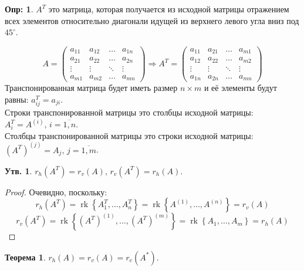 \documentclass[12pt]{article}
\theoremstyle{definition}
\newtheorem{defn}{Опр:}
\newtheorem{prop}{Утв.}
\newtheorem{theorem}{Теорема}
\DeclareMathOperator{\rk}{\text{rk}}
\begin{document}
\begin{defn}
	 $A^T$ это матрица, которая получается из исходной матрицы отражением всех элементов относительно диагонали идущей из верхнего левого угла вниз под $45^\circ$.
\end{defn}
$$
	A = 
	\begin{pmatrix}
		a_{11} & a_{12} & \dotsc & a_{1n}\\
		a_{21} & a_{22} & \dotsc & a_{2n}\\
		\vdots & \vdots & \ddots & \vdots \\
		a_{m1} & a_{m2} & \dotsc & a_{mn}
	\end{pmatrix} \Rightarrow A^T =
	\begin{pmatrix}
		a_{11} & a_{21} & \dotsc & a_{m1}\\
		a_{12} & a_{22} & \dotsc & a_{m2}\\
		\vdots & \vdots & \ddots & \vdots \\
		a_{1n} & a_{2n} & \dotsc & a_{mn}
	\end{pmatrix}
$$
Транспонированная матрица будет иметь размер $n \times m$ и её элементы будут равны: $a_{ij}^T = a_{ji}$.\\
Строки транспонированной матрицы это столбцы исходной матрицы: $A_i^T = A^{(i)}, \, i =\overline{1,n}$.\\
Столбцы транспонированной матрицы это строки исходной матрицы: $\left(A^T\right)^{(j)} = A_j, \, j =\overline{1,m}$.
\begin{prop}
	$r_{h}(A^T) = r_v(A), \, r_v\left(A^T\right) = r_h(A)$.
\end{prop}
\begin{proof}
	Очевидно, поскольку:
	$$
		r_h\left(A^T\right) = \rk{\left\{A_1^T, \dotsc, A_n^T\right\}} = \rk{\left\{A^{(1)}, \dotsc, A^{(n)}\right\}} = r_v(A)
	$$
	$$
		r_v\left(A^T\right) = \rk{\left\{\left(A^T\right)^{(1)}, \dotsc, \left(A^T\right)^{(m)}\right\}} = \rk{\left\{A_1, \dotsc, A_m\right\}}  = r_h(A)
	$$
\end{proof}
\begin{theorem}
	$r_h(A) = r_v(A) = r_{e}(A^*)$.
\end{theorem}
\end{document}
